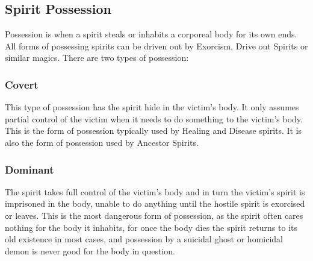 \subsection{Spirit Possession}
Possession is when a spirit steals or inhabits a corporeal body for its own ends. All forms of possessing spirits can be driven out by Exorcism, Drive out Spirits or similar magics. There are two types of possession:

\subsubsection{Covert}
This type of possession has the spirit hide in the victim’s body. It only assumes partial control of the victim when it needs to do something to the victim’s body. This is the form of possession typically used by Healing and Disease spirits. It is also the form of possession used by Ancestor Spirits.

\subsubsection{Dominant}
The spirit takes full control of the victim’s body and in turn the victim’s spirit is imprisoned in the body, unable to do anything until the hostile spirit is exorcised or leaves. This is the most dangerous form of possession, as the spirit often cares nothing for the body it inhabits, for once the body dies the spirit returns to its old existence in most cases, and possession by a suicidal ghost or homicidal demon is never good for the body in question.


